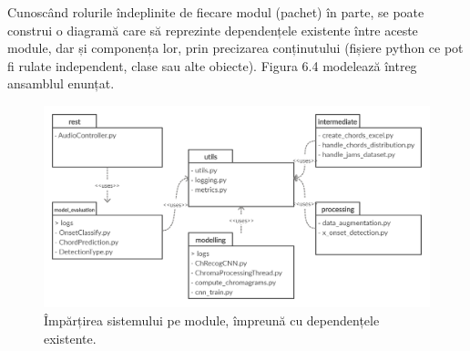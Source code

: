 \documentclass[a4paper,12pt]{report}
\begin{document}
Cunoscând rolurile îndeplinite de fiecare modul (pachet) în parte, se 
poate construi o diagramă care să reprezinte dependențele existente 
între aceste module, dar și componența lor, prin precizarea conținutului
(fișiere python ce pot fi rulate independent, clase sau alte obiecte).
Figura 6.4 modelează întreg ansamblul enunțat. 

\begin{figure}[h!]
    \centering
    \includegraphics[width=15.8cm]{..//resources//images//packages_diagram2.png} 
    \caption{Împărțirea sistemului pe module, împreună cu 
    dependențele existente.}
\end{figure}
\newpage

\end{document}
